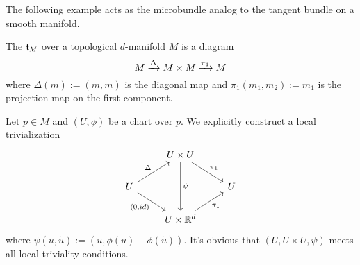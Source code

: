 \begin{myparagraph}
    The following example acts as the microbundle analog to the tangent bundle on a smooth manifold.
\end{myparagraph}

\begin{myexample}
    The  $\bt_M$ over a topological $d$-manifold $M$ is a diagram
    \[ M \xrightarrow{\Delta} M \times M \xrightarrow{\pi_1} M{} \]
    where $\Delta(m) := (m, m)$ is the diagonal map and $\pi_1(m_1, m_2) := m_1$ is the projection map on the first component.
    \begin{myproof}[$\bt_M$ is a microbundle]
        Let $p \in M$ and $(U, \phi)$ be a chart over $p$.
        We explicitly construct a local trivialization
        \[\begin{tikzcd}
            & U \times U \ar[dr, "\pi_1"] \ar[dd, "{\psi}"] & \\
            U \ar[ur, "\Delta"] \ar[dr, "{(0, id)}"'] & & U \\
            & U \times \R^d \ar[ur, "\pi_1"'] &
        \end{tikzcd}\]
        where $\psi(u, \tilde{u}) := (u, \phi(u) - \phi(\tilde{u}))$.
        It's obvious that $(U, U \times U, \psi)$ meets all local triviality conditions.
    \end{myproof}
\end{myexample}